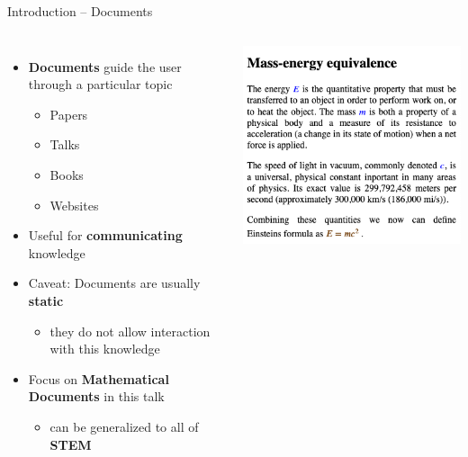 \documentclass{beamer}
\begin{document}
    \begin{frame}{Introduction -- Documents}
        \begin{columns}
            \begin{itemize}
                \item \textbf{Documents} guide the user through a particular topic
                \begin{itemize}
                    \item Papers
                    \item Talks
                    \item Books
                    \item Websites
                \end{itemize}
                \item Useful for \textbf{communicating} knowledge
                \item Caveat: Documents are usually \textbf{static}
                \begin{itemize}
                    \item they do not allow interaction with this knowledge
                \end{itemize}
                \item Focus on \textbf{Mathematical Documents} in this talk
                \begin{itemize}
                    \item can be generalized to all of \textbf{STEM}
                \end{itemize}
            \end{itemize}
            \includegraphics[scale=0.25]{images/doc}
        \end{columns}
    \end{frame}
\end{document}
